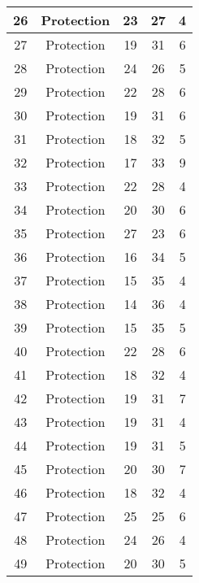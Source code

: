 \documentclass[results.tex]{subfiles}
\begin{document}
\begin{center}
\begin{tabular}{| c || c | c | c | c |}
    \hline
    26 & Protection & 23 & 27 & 4 \\ 
    \hline
    27 & Protection & 19 & 31 & 6 \\ 
    \hline
    28 & Protection & 24 & 26 & 5 \\ 
    \hline
    29 & Protection & 22 & 28 & 6 \\ 
    \hline
    30 & Protection & 19 & 31 & 6 \\ 
    \hline
    31 & Protection & 18 & 32 & 5 \\ 
    \hline
    32 & Protection & 17 & 33 & 9 \\ 
    \hline
    33 & Protection & 22 & 28 & 4 \\ 
    \hline
    34 & Protection & 20 & 30 & 6 \\ 
    \hline
    35 & Protection & 27 & 23 & 6 \\ 
    \hline
    36 & Protection & 16 & 34 & 5 \\ 
    \hline
    37 & Protection & 15 & 35 & 4 \\ 
    \hline
    38 & Protection & 14 & 36 & 4 \\ 
    \hline
    39 & Protection & 15 & 35 & 5 \\ 
    \hline
    40 & Protection & 22 & 28 & 6 \\ 
    \hline
    41 & Protection & 18 & 32 & 4 \\ 
    \hline
    42 & Protection & 19 & 31 & 7 \\ 
    \hline
    43 & Protection & 19 & 31 & 4 \\ 
    \hline
    44 & Protection & 19 & 31 & 5 \\ 
    \hline
    45 & Protection & 20 & 30 & 7 \\ 
    \hline
    46 & Protection & 18 & 32 & 4 \\ 
    \hline
    47 & Protection & 25 & 25 & 6 \\ 
    \hline
    48 & Protection & 24 & 26 & 4 \\ 
    \hline
    49 & Protection & 20 & 30 & 5 \\ 
    \hline   \end{tabular}
\end{center}
\end{document}
